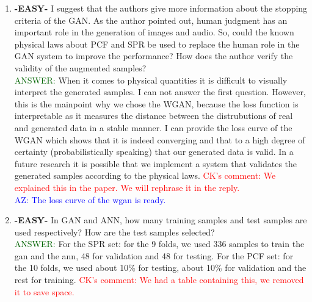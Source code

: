 \documentclass{article}
\begin{document}
\begin{enumerate}
	\item \textbf{-EASY-} I suggest that the authors give more information about the stopping criteria of the GAN. As the author pointed out, human judgment has an important role in the generation of images and audio. So, could the known physical laws about PCF and SPR be used to replace the human role in the GAN system to improve the performance? How does the author verify the validity of the augmented samples? \\
	\textcolor{darkgreen}{ANSWER: } When it comes to physical quantities it is difficult to visually interpret the generated samples. I can not answer the first question. However, this is the mainpoint why we chose the WGAN, because the loss function is interpretable as it measures the distance between the distrubutions of real and generated data in a stable manner. I can provide the loss curve of the WGAN which shows that it is indeed converging and that to a high degree of certainty (probabilistically speaking) that our generated data is valid. In a future research it is possible that we implement a system that validates the generated samples according to the physical laws. \textcolor{red}{CK's comment: We explained this in the paper. We will rephrase it in the reply. } \\ \textcolor{blue}{AZ: The loss curve of the wgan is ready.}

\item \textbf{-EASY-} In GAN and ANN, how many training samples and test samples are used respectively? How are the test samples selected? \\
\textcolor{darkgreen}{ANSWER: } For the SPR set: for the 9 folds, we used 336 samples to train the gan and the ann, 48 for validation and 48 for testing. For the PCF set: for the 10 folds, we used about 10\% for testing, about 10\% for validation and the rest for training. \textcolor{red}{CK's comment: We had a table containing this, we removed it to save space.}


\end{enumerate}
\end{document}

